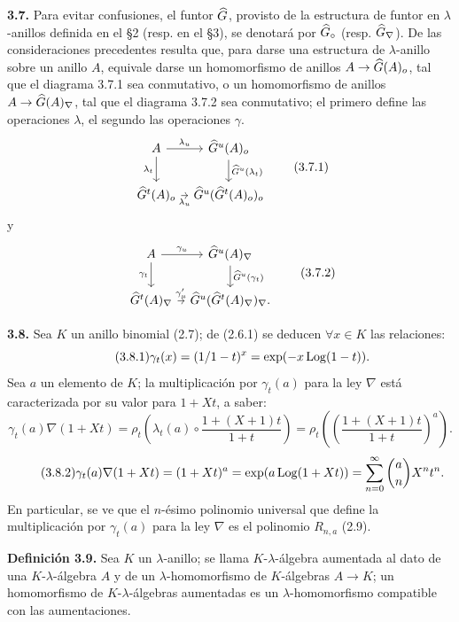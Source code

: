 \textbf{3.7.} Para evitar confusiones, el funtor \(\widehat G\), provisto de la estructura de funtor en \(\lambda\)-anillos definida en el §2 (resp. en el §3), se denotará por \(\widehat G_{\circ}\) (resp. \(\widehat G_{\nabla}\)). De las consideraciones precedentes resulta que, para darse una estructura de \(\lambda\)-anillo sobre un anillo \(A\), equivale darse un homomorfismo de anillos \(A\to\widehat G(A)_o\), tal que el diagrama 3.7.1 sea conmutativo, o un homomorfismo de anillos \(A\to\widehat G(A)_\nabla\), tal que el diagrama 3.7.2 sea conmutativo; el primero define las operaciones \(\lambda\), el segundo las operaciones \(\gamma\).
\[
\begin{tikzcd}[column sep=tiny]
A \arrow[r,"\lambda_u"] \arrow[d,"\lambda_t"'] & \Ghat^u(A)_o \arrow[d,"\Ghat^u(\lambda_t)"]\\
\Ghat^t(A)_o \arrow[r,"\lambda_u"'] & \Ghat^u(\Ghat^t(A)_o)_o
\end{tikzcd}
\tag{3.7.1}
\]
y
\[
\begin{tikzcd}[column sep=tiny]
A \arrow[r,"\gamma_u"] \arrow[d,"\gamma_t"'] & \Ghat^u(A)_\nabla \arrow[d,"\Ghat^u(\gamma_t)"]\\
\Ghat^t(A)_\nabla \arrow[r,"\gamma'_u"] & \Ghat^u(\Ghat^t(A)_\nabla)_\nabla.
\end{tikzcd}
\tag{3.7.2}
\]

\textbf{3.8.} Sea \(K\) un anillo binomial (2.7); de (2.6.1) se deducen \(\forall x\in K\) las relaciones:
\begin{equation}\tag{3.8.1}
  \gamma_t(x)=(1/1-t)^x
  =\exp(-x\operatorname{Log}(1-t)).
\end{equation}
Sea \(a\) un elemento de \(K\); la multiplicación por \(\gamma_t(a)\) para la ley \(\nabla\) está caracterizada por su valor para \(1+Xt\), a saber:
\[
  \gamma_t(a)\nabla(1+Xt)=\rho_t\left(\lambda_t(a)\circ\frac{1+(X+1)t}{1+t}\right)=\rho_t\left(\left(\frac{1+(X+1)t}{1+t}\right)^a\right).
\]
\begin{equation}\tag{3.8.2}
  \gamma_t(a)\nabla(1+Xt)
  =(1+Xt)^a
  =\exp(a\operatorname{Log}(1+Xt))
  =\sum_{n=0}^{\infty}\binom{a}{n}X^nt^n .
\end{equation}
En particular, se ve que el \(n\)-ésimo polinomio universal que define la multiplicación por \(\gamma_t(a)\) para la ley \(\nabla\) es el polinomio \(R_{n,a}\) (2.9).

\textbf{Definición 3.9.} Sea \(K\) un \(\lambda\)-anillo; se llama \(K\)-\(\lambda\)-álgebra aumentada al dato de una \(K\)-\(\lambda\)-álgebra \(A\) y de un \(\lambda\)-homomorfismo de \(K\)-álgebras \(A\to K\); un homomorfismo de \(K\)-\(\lambda\)-álgebras aumentadas es un \(\lambda\)-homomorfismo compatible con las aumentaciones.

